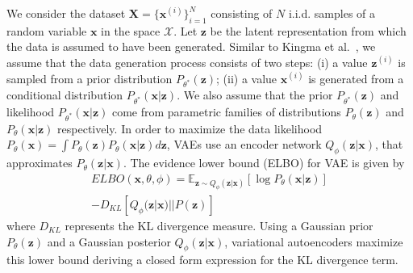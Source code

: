 \documentclass[letterpaper]{article} %
\begin{document}
We consider the dataset $\mathbf{X}=\{\mathbf{x}^{(i)}\}_{i=1}^{N}$ consisting of $N$ i.i.d. samples of a random variable $\mathbf{x}$ in the space $\mathcal{X}$. Let $\mathbf{z}$ be the latent representation from which the data is assumed to have been generated. Similar to Kingma et al.~, we assume that the data generation process consists of two steps: (i) a value $\mathbf{z}^{(i)}$ is sampled from a prior distribution $P_{\theta^{*}}(\mathbf{z})$; (ii) a value $\mathbf{x}^{(i)}$ is generated from a conditional distribution $P_{\theta^{*}}(\mathbf{x|z})$. We also assume that the prior $P_{\theta^{*}}(\mathbf{z})$ and likelihood $P_{\theta^{*}}(\mathbf{x|z})$ come from parametric families of distributions $P_{\theta}(\mathbf{z})$ and $P_{\theta}(\mathbf{x|z})$ respectively. In order to maximize the data likelihood $P_{\theta}(\mathbf{x}) = \int P_{\theta}(\mathbf{z})P_{\theta}(\mathbf{x}|\mathbf{z})d\mathbf{z}$, VAEs  use an encoder network $Q_\phi(\mathbf{z}|\mathbf{x})$, that approximates $P_\theta(\mathbf{z}|\mathbf{x})$. The evidence lower bound (ELBO) for VAE is given by
\begin{equation}
\begin{split}
ELBO(\mathbf{x},\theta,\phi) = \mathbb{E}_{\mathbf{z}\sim Q_{\phi}(\mathbf{z}|\mathbf{x})}[\log P_\theta(\mathbf{x}|\mathbf{z})]\\
- D_{\mathit{KL}}[Q_{\phi}(\mathbf{z}|\mathbf{x}) || P(\mathbf{z})]
\end{split}
\label{vae_loss}
\end{equation}
where $D_{\mathit{\mathit{KL}}}$ represents the KL divergence measure. Using a Gaussian prior $P_{\theta}(\mathbf{z})$ and a Gaussian posterior $Q_{\phi}(\mathbf{z}|\mathbf{x})$, variational autoencoders maximize this lower bound deriving a closed form expression for the KL divergence term.
\end{document}
